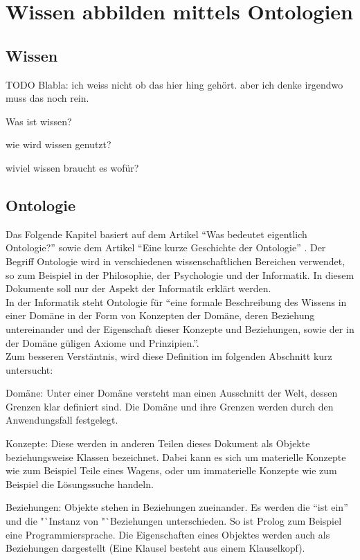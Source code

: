 \chapter{Wissen abbilden mittels Ontologien}
\label{chap:ontologien}

\section{Wissen}
\label{sec:ontologien_wissen}
TODO Blabla: ich weiss nicht ob das hier hing gehört. aber ich denke irgendwo muss das noch rein.

Was ist wissen?

wie wird wissen genutzt?

wiviel wissen braucht es wofür?

\section{Ontologie}
\label{sec:ontologien_onto}
Das Folgende Kapitel basiert auf dem Artikel "`Was bedeutet eigentlich Ontologie?"'\cite{IspekOntoBedeutung} sowie dem Artikel "`Eine kurze Geschichte der Ontologie"' \cite{ISpekOntoGeschichte}.
Der Begriff Ontologie wird in verschiedenen wissenschaftlichen Bereichen verwendet, so zum Beispiel in der Philosophie, der Psychologie und der Informatik. In diesem Dokumente soll nur der Aspekt der Informatik erklärt werden. \\
In der Informatik steht Ontologie für "`eine formale Beschreibung des Wissens in einer Domäne in der Form von Konzepten der Domäne, deren Beziehung untereinander und der Eigenschaft dieser Konzepte und Beziehungen, sowie der in der Domäne güligen Axiome und Prinzipien."'\cite[S.310]{ISpekOntoGeschichte}.\\
Zum besseren Verstäntnis, wird diese Definition im folgenden Abschnitt kurz untersucht:

Domäne: Unter einer Domäne versteht man einen Ausschnitt der Welt, dessen Grenzen klar definiert sind. Die Domäne und ihre Grenzen werden durch den Anwendungsfall festgelegt.

Konzepte: Diese werden in anderen Teilen dieses Dokument als Objekte beziehungsweise Klassen bezeichnet. Dabei kann es sich um materielle Konzepte wie zum Beispiel Teile eines Wagens, oder um immaterielle Konzepte wie zum Beispiel die Lösungssuche handeln.

Beziehungen: Objekte stehen in Beziehungen zueinander. Es werden die "`ist ein"' und die "`Instanz von "`Beziehungen unterschieden. So ist Prolog zum Beispiel eine Programmiersprache. Die Eigenschaften eines Objektes werden auch als Beziehungen dargestellt (Eine Klausel besteht aus einem Klauselkopf).

